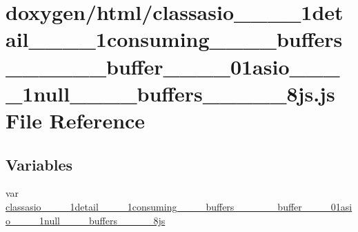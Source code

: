 \hypertarget{classasio____1____1detail____1____1consuming________buffers____3____01____buffer____00____01asiof0b616a7ff4e0c89977357fd7ca58f22}{}\section{doxygen/html/classasio\+\_\+\+\_\+\_\+\+\_\+1detail\+\_\+\+\_\+\_\+\+\_\+1consuming\+\_\+\+\_\+\+\_\+\+\_\+buffers\+\_\+\+\_\+\_\+\+\_\+\_\+\+\_\+buffer\+\_\+\+\_\+\_\+\+\_\+01asio\+\_\+\+\_\+\_\+\+\_\+1null\+\_\+\+\_\+\+\_\+\+\_\+buffers\+\_\+\+\_\+\_\+\+\_\+\_\+8js.js File Reference}
\label{classasio____1____1detail____1____1consuming________buffers____3____01____buffer____00____01asiof0b616a7ff4e0c89977357fd7ca58f22}
\subsection*{Variables}
\begin{DoxyCompactItemize}
\item 
var \hyperlink{classasio____1____1detail____1____1consuming________buffers____3____01____buffer____00____01asiof0b616a7ff4e0c89977357fd7ca58f22_aadf21a3dbb3ab48a31dfc11aecd6bb54}{classasio\+\_\+\+\_\+\_\+\+\_\+1detail\+\_\+\+\_\+\_\+\+\_\+1consuming\+\_\+\+\_\+\+\_\+\+\_\+buffers\+\_\+\+\_\+\_\+\+\_\+\_\+\+\_\+buffer\+\_\+\+\_\+\_\+\+\_\+01asio\+\_\+\+\_\+\_\+\+\_\+1null\+\_\+\+\_\+\+\_\+\+\_\+buffers\+\_\+\+\_\+\_\+\+\_\+\_\+8js}
\end{DoxyCompactItemize}


